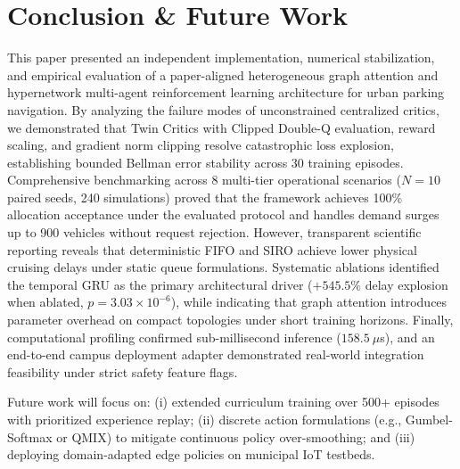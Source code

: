 \documentclass[journal]{IEEEtran}
\begin{document}
\section{Conclusion \& Future Work}
\label{sec:conclusion}
This paper presented an independent implementation, numerical stabilization, and empirical evaluation of a paper-aligned heterogeneous graph attention and hypernetwork multi-agent reinforcement learning architecture for urban parking navigation. By analyzing the failure modes of unconstrained centralized critics, we demonstrated that Twin Critics with Clipped Double-Q evaluation, reward scaling, and gradient norm clipping resolve catastrophic loss explosion, establishing bounded Bellman error stability across 30 training episodes. Comprehensive benchmarking across 8 multi-tier operational scenarios ($N=10$ paired seeds, 240 simulations) proved that the framework achieves 100\% allocation acceptance under the evaluated protocol and handles demand surges up to 900 vehicles without request rejection. However, transparent scientific reporting reveals that deterministic FIFO and SIRO achieve lower physical cruising delays under static queue formulations. Systematic ablations identified the temporal GRU as the primary architectural driver ($+545.5\%$ delay explosion when ablated, $p = 3.03 \times 10^{-6}$), while indicating that graph attention introduces parameter overhead on compact topologies under short training horizons. Finally, computational profiling confirmed sub-millisecond inference ($158.5~\mu$s), and an end-to-end campus deployment adapter demonstrated real-world integration feasibility under strict safety feature flags.

Future work will focus on: (i) extended curriculum training over 500+ episodes with prioritized experience replay; (ii) discrete action formulations (e.g., Gumbel-Softmax or QMIX) to mitigate continuous policy over-smoothing; and (iii) deploying domain-adapted edge policies on municipal IoT testbeds.



\end{document}
